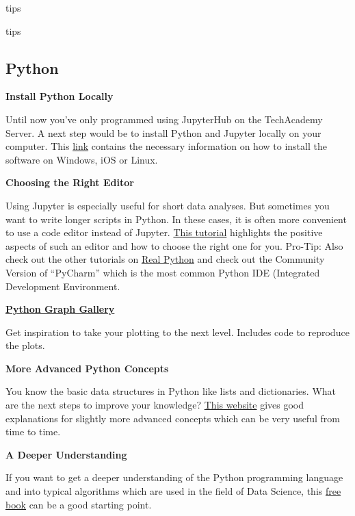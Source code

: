 \documentclass[
  11pt,
]{article}
\newenvironment{tips}[1]
  {
  \begin{itemize}
  \footnotesize
  \renewcommand{\labelitemi}{
    \raisebox{-.7\height}[0pt][0pt]{
      {\setkeys{Gin}{width=3em,keepaspectratio}
        \texttt{[image: images/\#1.png]}}
    }
  }
  \setlength{\fboxsep}{1em}
  \begin{rbox}
  \item
  }
  {
  \end{rbox}
  \end{itemize}
  }
\newenvironment{tipsp}[1]
  {
  \begin{itemize}
  \footnotesize
  \renewcommand{\labelitemi}{
    \raisebox{-.7\height}[0pt][0pt]{
      {\setkeys{Gin}{width=3em,keepaspectratio}
        \texttt{[image: images/\#1.png]}}
    }
  }
  \setlength{\fboxsep}{1em}
  \begin{pbox}
  \item
  }
  {
  \end{pbox}
  \end{itemize}
  }
\begin{document}
\begin{tips}
\begin{tips}
\begin{tips}
\end{tips}

\hypertarget{python}{%
\subsection{Python}\label{python}}

\begin{tipsp}p
\textbf{Install Python Locally}

Until now you've only programmed using JupyterHub on the TechAcademy Server. A next step would be to install Python and Jupyter locally on your computer. This \href{https://docs.anaconda.com/anaconda/install/}{link} contains the necessary information on how to install the software on Windows, iOS or Linux.

\textbf{Choosing the Right Editor}

Using Jupyter is especially useful for short data analyses. But sometimes you want to write longer scripts in Python. In these cases, it is often more convenient to use a code editor instead of Jupyter. \href{https://realpython.com/learning-paths/perfect-your-python-development-setup/}{This tutorial} highlights the positive aspects of such an editor and how to choose the right one for you. Pro-Tip: Also check out the other tutorials on \href{https://realpython.com/}{Real Python} and check out the Community Version of ``PyCharm'' which is the most common Python IDE (Integrated Development Environment.

\textbf{\href{https://python-graph-gallery.com/}{Python Graph Gallery}}

Get inspiration to take your plotting to the next level. Includes code to reproduce the plots.

\textbf{More Advanced Python Concepts}

You know the basic data structures in Python like lists and dictionaries. What are the next steps to improve your knowledge? \href{https://book.pythontips.com/en/latest/index.html}{This website} gives good explanations for slightly more advanced concepts which can be very useful from time to time.

\textbf{A Deeper Understanding}

If you want to get a deeper understanding of the Python programming language and into typical algorithms which are used in the field of Data Science, this \href{https://github.com/ab-anand/py-books/blob/master/Data\%20Science\%20from\%20Scratch-\%20First\%20Principles\%20with\%20Python.pdf}{free book} can be a good starting point.


\end{tipsp}
\end{tips}
\end{tips}
\end{document}
